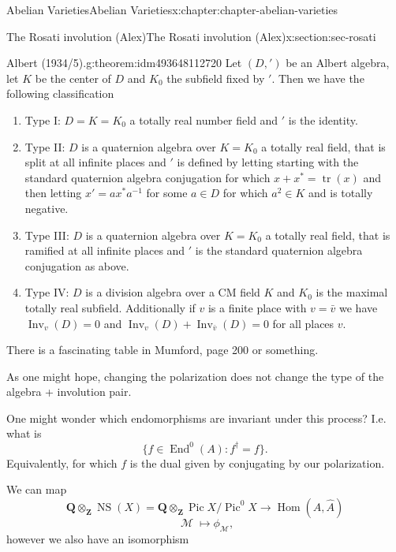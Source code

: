 \documentclass[oneside,10pt,]{book}
\numberwithin{equation}{section}
\newcommand{\sheaf}[1]{\operatorname{\mathcal{#1}}}
\newcommand{\ZZ}{\mathbf{Z}}
\newcommand{\QQ}{\mathbf{Q}}
\DeclareMathOperator{\End}{End}
\DeclareMathOperator{\Hom}{Hom}
\DeclareMathOperator{\Pic}{Pic}
\DeclareMathOperator{\tr}{tr}
\DeclareMathOperator{\NS}{NS}
\begin{document}
\begin{chapterptx}{Abelian Varieties}{}{Abelian Varieties}{}{}{x:chapter:chapter-abelian-varieties}
\begin{sectionptx}{The Rosati involution (Alex)}{}{The Rosati involution (Alex)}{}{}{x:section:sec-rosati}
\begin{theorem}{Albert (1934\slash{}5).}{}{g:theorem:idm493648112720}%
Let \((D, ')\) be an Albert algebra, let \(K\) be the center of \(D\) and \(K_0\) the subfield fixed by \('\). Then we have the following classification%
\begin{enumerate}
\item{}Type I: \(D = K = K_0\) a totally real number field and \('\) is the identity.%
\item{}Type II: \(D\) is a quaternion algebra over \(K = K_0\) a totally real field, that is split at all infinite places and \('\) is defined by letting starting with the standard quaternion algebra conjugation for which \(x + x^* = \tr(x)\) and then letting \(x' = ax^* a^{-1}\) for some \(a \in D\) for which \(a^2 \in K\) and is totally negative.%
\item{}Type III: \(D\) is a quaternion algebra over \(K = K_0\) a totally real field, that is ramified at all infinite places and \('\) is the standard quaternion algebra conjugation as above.%
\item{}Type IV: \(D\) is a division algebra over a CM field \(K\) and \(K_0\) is the maximal totally real subfield. Additionally if \(v\) is a finite place with \(v = \bar v\) we have \(\operatorname{Inv}_v(D) = 0\) and \(\operatorname{Inv}_v(D) + \operatorname{Inv}_{\bar v}(D) = 0\) for all places \(v\).%
\end{enumerate}
%
\end{theorem}
There is a fascinating table in Mumford, page 200 or something.%
\par
As one might hope, changing the polarization does not change the type of the algebra + involution pair.%
\par
One might wonder which endomorphisms are invariant under this process? I.e. what is%
\begin{equation*}
\{f \in \End^0(A) : f^\dagger = f\}\text{.}
\end{equation*}
Equivalently, for which \(f\) is the dual given by conjugating by our polarization.%
\par
We can map%
\begin{equation*}
\QQ \otimes_\ZZ \NS(X) = \QQ \otimes_\ZZ \Pic X/\Pic^0 X \to \Hom(A, \hat A)
\end{equation*}
%
\begin{equation*}
\sheaf M \mapsto \phi_{\sheaf M}\text{,}
\end{equation*}
however we also have an isomorphism%
\begin{equation*}

\end{equation*}
\end{sectionptx}
\end{chapterptx}
\end{document}
